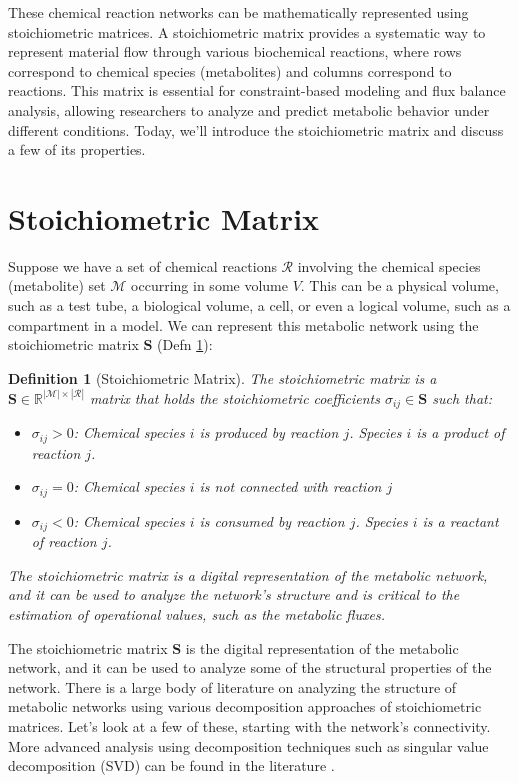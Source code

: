 \documentclass{article}[11pt]
\newtheorem{defn}{Definition}
\begin{document}
These chemical reaction networks can be mathematically represented using stoichiometric matrices. 
A stoichiometric matrix provides a systematic way to represent material flow through various biochemical reactions, where rows correspond to chemical species (metabolites) and columns correspond to reactions. 
This matrix is essential for constraint-based modeling and flux balance analysis, allowing researchers to analyze and predict metabolic behavior under different conditions. 
Today, we'll introduce the stoichiometric matrix and discuss a few of its properties.

\section{Stoichiometric Matrix}
Suppose we have a set of chemical reactions $\mathcal{R}$ involving the chemical species (metabolite) set $\mathcal{M}$ occurring in some volume $V$.
This can be a physical volume, such as a test tube, a biological volume, a cell, or even a logical volume, such as a compartment in a model.
We can represent this metabolic network using the stoichiometric matrix $\mathbf{S}$ (Defn \ref{defn-stoichiometric-matrix}):

\begin{defn}[Stoichiometric Matrix]\label{defn-stoichiometric-matrix}
The stoichiometric matrix is a $\mathbf{S}\in\mathbb{R}^{|\mathcal{M}|\times|\mathcal{R}|}$ matrix that holds the stoichiometric coefficients $\sigma_{ij}\in\mathbf{S}$ such that:
   \begin{itemize}[leftmargin=16pt]
      \item{$\sigma_{ij}>0$: Chemical species $i$ is \textit{produced} by reaction $j$. Species $i$ is a product of reaction $j$.}
      \item{$\sigma_{ij} = 0$: Chemical species $i$ is not connected with reaction $j$}
      \item{$\sigma_{ij}<0$: Chemical species $i$ is \textit{consumed} by reaction $j$. Species $i$ is a reactant of reaction $j$.}
   \end{itemize}
   The stoichiometric matrix is a digital representation of the metabolic network, and it can be used to analyze the network's structure and is critical to the estimation of operational values, such as the metabolic fluxes.
\end{defn}

The stoichiometric matrix $\mathbf{S}$ is the digital representation of the metabolic network, and it can be used to analyze some of the structural properties of the network.
There is a large body of literature on analyzing the structure of metabolic networks using various decomposition approaches of stoichiometric matrices. Let's look at a few of these, starting with the network's connectivity. More advanced analysis using decomposition techniques such as singular value decomposition (SVD) can be found in the literature \cite{Famili:2003aa}.
\end{document}
